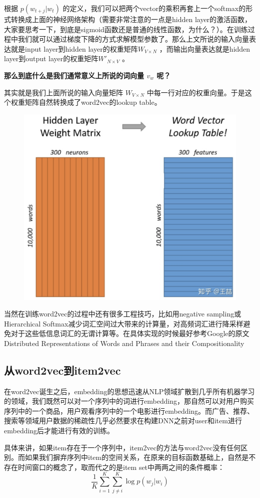 \documentclass[12pt]{article}
\begin{document}
根据 $p(w_{t+j}|w_t)$ 的定义，我们可以把两个vector的乘积再套上一个softmax的形式转换成上面的神经网络架构（需要非常注意的一点是hidden layer的激活函数，大家要思考一下，到底是sigmoid函数还是普通的线性函数，为什么？）。在训练过程中我们就可以通过梯度下降的方式求解模型参数了。那么上文所说的输入向量表达就是input layer到hidden layer的权重矩阵$W_{V\times N}$ ，而输出向量表达就是hidden layer到output layer的权重矩阵$W'_{N\times V}$ 。

\textbf{那么到底什么是我们通常意义上所说的词向量 $v_w$ 呢？}

其实就是我们上面所说的输入向量矩阵 $W_{V\times N}$ 中每一行对应的权重向量。于是这个权重矩阵自然转换成了word2vec的lookup table。
\begin{figure}[H]
    \centering
    \includegraphics[width=.6\textwidth]{fig/Word2Vec_Lookup_Table.png}
\end{figure}

当然在训练word2vec的过程中还有很多工程技巧，比如用negative sampling或Hierarchical Softmax减少词汇空间过大带来的计算量，对高频词汇进行降采样避免对于这些低信息词汇的无谓计算等。在具体实现的时候最好参考Google的原文 Distributed Representations of Words and Phrases and their Compositionality

\subsection{从word2vec到item2vec}
在word2vec诞生之后，embedding的思想迅速从NLP领域扩散到几乎所有机器学习的领域，我们既然可以对一个序列中的词进行embedding，那自然可以对用户购买序列中的一个商品，用户观看序列中的一个电影进行embedding。而广告、推荐、搜索等领域用户数据的稀疏性几乎必然要求在构建DNN之前对user和item进行embedding后才能进行有效的训练。

具体来讲，如果item存在于一个序列中，item2vec的方法与word2vec没有任何区别。而如果我们摒弃序列中item的空间关系，在原来的目标函数基础上，自然是不存在时间窗口的概念了，取而代之的是item set中两两之间的条件概率：
$$
\frac{1}{K}\sum_{i=1}^K\sum_{j \neq i}^K \log{p(w_j|w_i)}
$$
\end{document}
